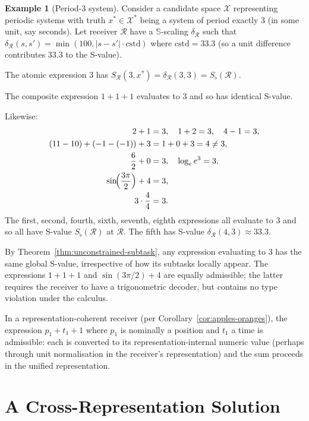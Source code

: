 \documentclass[twocolumn,11pt,a4paper]{article}
\theoremstyle{thmstyle}
\theoremstyle{thmstyle}
\theoremstyle{definition}
\newtheorem{example}[theorem]{Example}
\theoremstyle{remark}
\newcommand{\Sscale}{\mathbb{S}}
\newcommand{\Cands}{\mathcal{X}}
\newcommand{\Truth}{\mathcal{X}^{*}}
\newcommand{\receiver}{\mathcal{R}}
\newcommand{\Sscalar}{S}
\newcommand{\Sfloor}{S_{\flat}}
\begin{document}
\begin{example}[Period-3 system]\label{ex:period-3}
Consider a candidate space $\Cands$ representing
periodic systems with truth $x^{*} \in \Truth$ being
a system of period exactly $3$ (in some unit, say
seconds).  Let receiver $\receiver$ have a
$\Sscale$-scaling $\delta_{\receiver}$ such that
$\delta_{\receiver}(s, s') = \min(100, |s - s'|
\cdot \mathrm{cstd})$ where $\mathrm{cstd} = 33.3$
(so a unit difference contributes $33.3$ to the
S-value).

The atomic expression $3$ has
$\Sscalar_{\receiver}(3, x^{*}) = \delta_{\receiver}
(3, 3) = \Sfloor(\receiver)$.

The composite expression $1 + 1 + 1$ evaluates to
$3$ and so has identical S-value.

Likewise:
\begin{align*}
2 + 1 &= 3, \quad 1 + 2 = 3, \quad 4 - 1 = 3, \\
(11 - 10) + (-1 - (-1)) + 3 &= 1 + 0 + 3 = 4 \neq 3, \\
\frac{6}{2} + 0 &= 3, \quad \log_{e} e^{3} = 3, \\
\sin\!\Bigl(\frac{3\pi}{2}\Bigr) + 4 &= 3, \\
3 \cdot \frac{4}{4} &= 3.
\end{align*}
The first, second, fourth, sixth, seventh, eighth
expressions all evaluate to $3$ and so all have
S-value $\Sfloor(\receiver)$ at $\receiver$.  The
fifth has S-value
$\delta_{\receiver}(4, 3) \approx 33.3$.

By Theorem~\ref{thm:unconstrained-subtask}, any
expression evaluating to $3$ has the same global
S-value, irrespective of how its subtasks
locally appear.  The expressions
$1 + 1 + 1$ and $\sin(3\pi/2) + 4$ are equally
admissible; the latter requires the receiver to
have a trigonometric decoder, but contains no
type violation under the calculus.

In a representation-coherent receiver
(per Corollary~\ref{cor:apples-oranges}), the
expression $p_{1} + t_{1} + 1$ where $p_{1}$ is
nominally a position and $t_{1}$ a time is
admissible: each is converted to its
representation-internal numeric value (perhaps
through unit normalisation in the receiver's
representation) and the sum proceeds in the unified
representation.
\end{example}

\section{A Cross-Representation Solution}
\label{sec:cross-rep-example}
\end{document}
